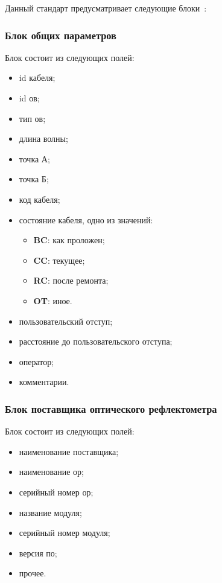 Данный стандарт предусматривает следующие блоки~\cite{web:otdr_format}:

\subsubsection{Блок общих параметров}

Блок состоит из следующих полей:
\begin{itemize}
  \item id кабеля;
  \item id \acrshort{ов};
  \item тип \acrshort{ов};
  \item длина волны;
  \item точка А;
  \item точка Б;
  \item код кабеля;
  \item состояние кабеля, одно из значений:
  \begin{itemize}
    \item \textbf{BC}: как проложен;
    \item \textbf{CC}: текущее;
    \item \textbf{RC}: после ремонта;
    \item \textbf{OT}: иное.
  \end{itemize}
  \item пользовательский отступ;
  \item расстояние до пользовательского отступа;
  \item оператор;
  \item комментарии.
\end{itemize}

\subsubsection{Блок поставщика оптического рефлектометра}

Блок состоит из следующих полей:
\begin{itemize}
  \item наименование поставщика;
  \item наименование \acrshort{ор};
  \item серийный номер \acrshort{ор};
  \item название модуля;
  \item серийный номер модуля;
  \item версия \acrshort{по};
  \item прочее.
\end{itemize}


